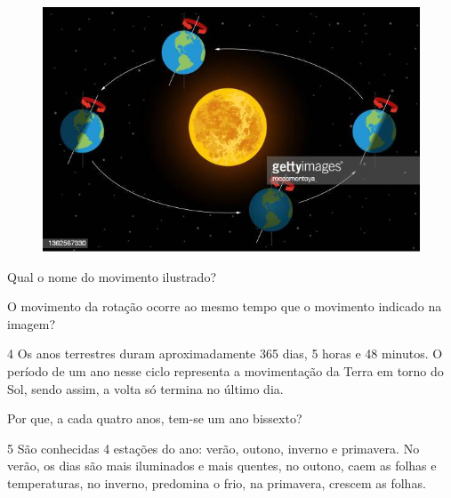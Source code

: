 \begin{figure}[htpb!]
\includegraphics[width=\textwidth]{./imgs/img3.png}
\end{figure}

\begin{escolha}
\item Qual o nome do movimento ilustrado?


\item O movimento da rotação ocorre ao mesmo tempo que o movimento indicado na imagem?

\end{escolha}

\num{4} Os anos terrestres duram aproximadamente 365 dias, 5 horas
e 48 minutos. O período de um ano nesse ciclo representa a movimentação
da Terra em torno do Sol, sendo assim, a volta só termina no último dia.

Por que, a cada quatro anos, tem-se um ano bissexto?


\num{5} São conhecidas 4 estações do ano: verão, outono, inverno e
primavera. No verão, os dias são mais iluminados e mais quentes, no
outono, caem as folhas e temperaturas, no inverno, predomina o frio, na
primavera, crescem as folhas.

